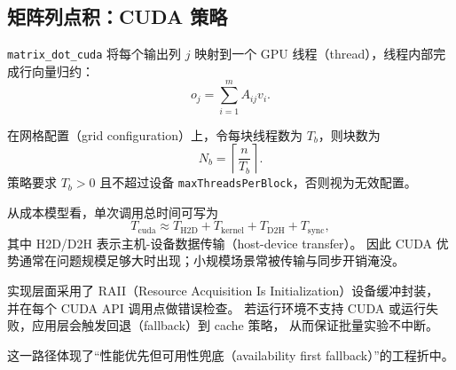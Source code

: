 \subsection{矩阵列点积：CUDA 策略}

\texttt{matrix\_dot\_cuda} 将每个输出列 \(j\) 映射到一个 GPU 线程（thread），线程内部完成行向量归约：
\begin{equation}
 o_j = \sum_{i=1}^{m}A_{ij}v_i.
\end{equation}

在网格配置（grid configuration）上，令每块线程数为 \(T_b\)，则块数为
\begin{equation}
N_b = \left\lceil\frac{n}{T_b}\right\rceil.
\end{equation}
策略要求 \(T_b>0\) 且不超过设备 \texttt{maxThreadsPerBlock}，否则视为无效配置。

从成本模型看，单次调用总时间可写为
\begin{equation}
T_{\text{cuda}} \approx T_{\text{H2D}} + T_{\text{kernel}} + T_{\text{D2H}} + T_{\text{sync}},
\end{equation}
其中 H2D/D2H 表示主机-设备数据传输（host-device transfer）。
因此 CUDA 优势通常在问题规模足够大时出现；小规模场景常被传输与同步开销淹没。

实现层面采用了 RAII（Resource Acquisition Is Initialization）设备缓冲封装，
并在每个 CUDA API 调用点做错误检查。
若运行环境不支持 CUDA 或运行失败，应用层会触发回退（fallback）到 cache 策略，
从而保证批量实验不中断。

这一路径体现了“性能优先但可用性兜底（availability first fallback）”的工程折中。
